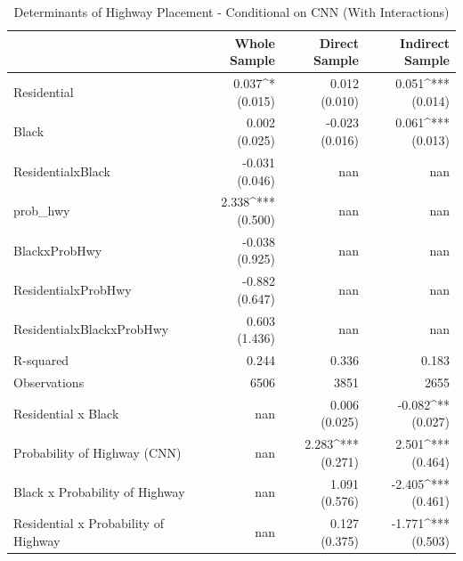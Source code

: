\begin{table}[h]
\centering
\caption{Determinants of Highway Placement - Conditional on CNN (With Interactions)}
\label{tab:cnn_covariate_interaction}
\begin{tabular*}{\textwidth}{@{\extracolsep{\fill}}l*{3}{r}}
\toprule
 & Whole Sample & Direct Sample & Indirect Sample \\
\midrule
Residential & \makecell[tr]{0.037^{*} \\ (0.015)} & \makecell[tr]{0.012 \\ (0.010)} & \makecell[tr]{0.051^{***} \\ (0.014)} \\
Black & \makecell[tr]{0.002 \\ (0.025)} & \makecell[tr]{-0.023 \\ (0.016)} & \makecell[tr]{0.061^{***} \\ (0.013)} \\
ResidentialxBlack & \makecell[tr]{-0.031 \\ (0.046)} & nan & nan \\
prob_hwy & \makecell[tr]{2.338^{***} \\ (0.500)} & nan & nan \\
BlackxProbHwy & \makecell[tr]{-0.038 \\ (0.925)} & nan & nan \\
ResidentialxProbHwy & \makecell[tr]{-0.882 \\ (0.647)} & nan & nan \\
ResidentialxBlackxProbHwy & \makecell[tr]{0.603 \\ (1.436)} & nan & nan \\
R-squared & 0.244 & 0.336 & 0.183 \\
Observations & 6506 & 3851 & 2655 \\
Residential x Black & nan & \makecell[tr]{0.006 \\ (0.025)} & \makecell[tr]{-0.082^{**} \\ (0.027)} \\
Probability of Highway (CNN) & nan & \makecell[tr]{2.283^{***} \\ (0.271)} & \makecell[tr]{2.501^{***} \\ (0.464)} \\
Black x Probability of Highway & nan & \makecell[tr]{1.091 \\ (0.576)} & \makecell[tr]{-2.405^{***} \\ (0.461)} \\
Residential x Probability of Highway & nan & \makecell[tr]{0.127 \\ (0.375)} & \makecell[tr]{-1.771^{***} \\ (0.503)} \\

\end{tabular*}
\end{table}
